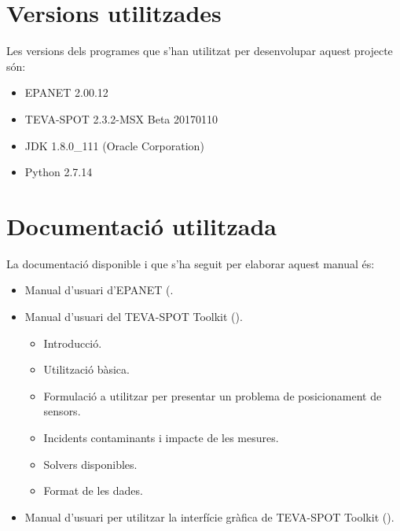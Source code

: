 \documentclass[12pt]{article}
\begin{document}
\section{Versions utilitzades}
Les versions dels programes que s'han utilitzat per desenvolupar aquest projecte són:
\begin{itemize}
	\item EPANET 2.00.12
	\item TEVA-SPOT 2.3.2-MSX Beta 20170110
	\item JDK 1.8.0\_111 (Oracle Corporation)
	\item Python 2.7.14
\end{itemize}

\clearpage
\section{Documentació utilitzada}
La documentació disponible i que s'ha seguit per elaborar aquest manual és:
\begin{itemize}
	\item Manual d'usuari d'EPANET (.
	\item Manual d'usuari del TEVA-SPOT Toolkit ().
	\begin{itemize}
		\item Introducció.
		\item Utilització bàsica.
		\item Formulació a utilitzar per presentar un problema de posicionament de sensors.
		\item Incidents contaminants i impacte de les mesures.
		\item Solvers disponibles.
		\item Format de les dades.
	\end{itemize}
	\item Manual d'usuari per utilitzar la interfície gràfica de TEVA-SPOT Toolkit ().
\end{itemize}
\end{document}
